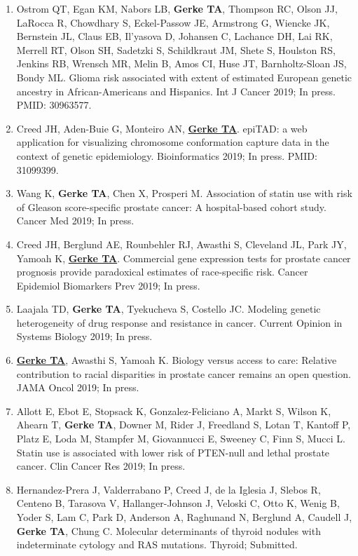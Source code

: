 \documentclass[11pt, a4paper]{article} %
\begin{document}
\begin{enumerate}[leftmargin=*]
\item{} Ostrom QT, Egan KM, Nabors LB, {\bf Gerke TA}, Thompson RC, Olson JJ, LaRocca R, Chowdhary S, Eckel-Passow JE, Armstrong G, Wiencke JK, Bernstein JL, Claus EB, Il'yasova D, Johansen C, Lachance DH, Lai RK, Merrell RT, Olson SH, Sadetzki S, Schildkraut JM, Shete S, Houlston RS, Jenkins RB, Wrensch MR, Melin B, Amos CI, Huse JT, Barnholtz-Sloan JS, Bondy ML. Glioma risk associated with extent of estimated European genetic ancestry in African-Americans and Hispanics. Int J Cancer 2019; In press. PMID: 30963577.

\item{} Creed JH, Aden-Buie G, Monteiro AN, \underline{{\bf Gerke TA}}. epiTAD: a web application for visualizing chromosome conformation capture data in the context of genetic epidemiology. Bioinformatics 2019; In press. PMID: 31099399. 

\item{} Wang K, {\bf Gerke TA}, Chen X, Prosperi M. Association of statin use with risk of Gleason score-specific prostate cancer: A hospital-based cohort study. Cancer Med 2019; In press.

\item{} Creed JH, Berglund AE, Rounbehler RJ, Awasthi S, Cleveland JL, Park JY, Yamoah K, \underline{{\bf Gerke TA}}. Commercial gene expression tests for prostate cancer prognosis provide paradoxical estimates of race-specific risk. Cancer Epidemiol Biomarkers Prev 2019; In press.

\item{} Laajala TD, {\bf Gerke TA}, Tyekucheva S, Costello JC. Modeling genetic heterogeneity of drug response and resistance in cancer. Current Opinion in Systems Biology 2019; In press.

\item{} \underline{{\bf Gerke TA}}, Awasthi S, Yamoah K. Biology versus access to care: Relative contribution to racial disparities in prostate cancer remains an open question. JAMA Oncol 2019; In press.

\item{} Allott E, Ebot E, Stopsack K, Gonzalez-Feliciano A, Markt S, Wilson K, Ahearn T, {\bf Gerke TA}, Downer M, Rider J, Freedland S, Lotan T, Kantoff P, Platz E, Loda M, Stampfer M, Giovannucci E, Sweeney C, Finn S, Mucci L. Statin use is associated with lower risk of PTEN-null and lethal prostate cancer. Clin Cancer Res 2019; In press.

\item{} Hernandez-Prera J, Valderrabano P, Creed J, de la Iglesia J, Slebos R, Centeno B, Tarasova V, Hallanger-Johnson J, Veloski C, Otto K, Wenig B, Yoder S, Lam C, Park D, Anderson A, Raghunand N, Berglund A, Caudell J, {\bf Gerke TA}, Chung C. Molecular determinants of thyroid nodules with indeterminate cytology and RAS mutations. Thyroid; Submitted.


\end{enumerate}
\end{document}
